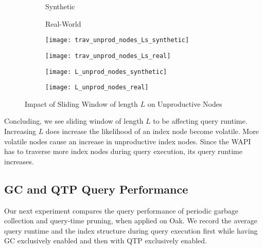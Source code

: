 \documentclass[abstracton,12pt]{scrartcl}
\theoremstyle{definition}
\begin{document}
\begin{figure}[h]
  \centering
  \begin{subfigure}{0.49\linewidth}
    \centering
    Synthetic
  \end{subfigure}
  \begin{subfigure}{0.49\linewidth}
    \centering
    Real-World
  \end{subfigure}
  \begin{subfigure}{0.49\linewidth}
    \centering
    \texttt{[image: trav\_unprod\_nodes\_Ls\_synthetic]}
    \caption{}
    \label{fig:trav_unprod_nodes_Ls_synthetic}
  \end{subfigure}
  \begin{subfigure}{0.49\linewidth}
    \centering
    \texttt{[image: trav\_unprod\_nodes\_Ls\_real]}
    \caption{}
    \label{fig:trav_unprod_nodes_Ls_real}
  \end{subfigure}
  \begin{subfigure}{0.49\linewidth}
    \centering
    \texttt{[image: L\_unprod\_nodes\_synthetic]}
    \caption{}
    \label{fig:L_trav_unprod_nodes_synthetic}
  \end{subfigure}
  \begin{subfigure}{0.49\linewidth}
    \centering
    \texttt{[image: L\_unprod\_nodes\_real]}
    \caption{}
    \label{fig:L_trav_unprod_nodes_real}
  \end{subfigure}
  \caption{Impact of Sliding Window of length $L$ on Unproductive Nodes}
\end{figure}

Concluding, we see sliding window of length $L$ to be affecting query runtime.
Increasing $L$ does increase the likelihood of an index node become volatile.
More volatile nodes cause an increase in unproductive index nodes. Since the
WAPI has to traverse more index nodes during query execution, its query runtime
increases.

\subsection{GC and QTP Query Performance}

\label{sec:gc-qtp-performance}

Our next experiment compares the query performance of periodic garbage collection and
query-time pruning, when applied on Oak. We record the average query runtime and
the index structure during query execution first while having GC exclusively enabled and
then with QTP exclusively enabled.
\end{document}
